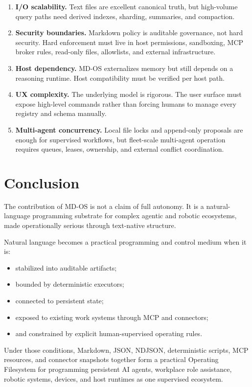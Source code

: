 \documentclass[11pt,a4paper]{article}
\begin{document}
\begin{enumerate}
  \item \textbf{I/O scalability.} Text files are excellent canonical truth, but
  high-volume query paths need derived indexes, sharding, summaries, and
  compaction.
  \item \textbf{Security boundaries.} Markdown policy is auditable governance,
  not hard security. Hard enforcement must live in host permissions, sandboxing,
  MCP broker rules, read-only files, allowlists, and external infrastructure.
  \item \textbf{Host dependency.} MD-OS externalizes memory but still depends on
  a reasoning runtime. Host compatibility must be verified per host path.
  \item \textbf{UX complexity.} The underlying model is rigorous. The user
  surface must expose high-level commands rather than forcing humans to manage
  every registry and schema manually.
  \item \textbf{Multi-agent concurrency.} Local file locks and append-only
  proposals are enough for supervised workflows, but fleet-scale multi-agent
  operation requires queues, leases, ownership, and external conflict
  coordination.
\end{enumerate}

\section{Conclusion}

The contribution of MD-OS is not a claim of full autonomy. It is a
natural-language programming substrate for complex agentic and robotic
ecosystems, made operationally serious through text-native structure.

Natural language becomes a practical programming and control medium when it is:

\begin{itemize}
  \item stabilized into auditable artifacts;
  \item bounded by deterministic executors;
  \item connected to persistent state;
  \item exposed to existing work systems through MCP and connectors;
  \item and constrained by explicit human-supervised operating rules.
\end{itemize}

Under those conditions, Markdown, JSON, NDJSON, deterministic scripts, MCP
resources, and connector snapshots together form a practical Operating
Filesystem for programming persistent AI agents, workplace role assistance,
robotic systems, devices, and host runtimes as one supervised ecosystem.
\end{document}
